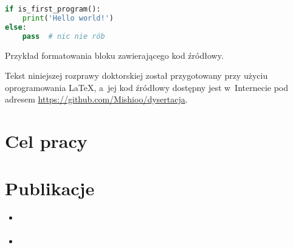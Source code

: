 \begin{listing}
\begin{lstlisting}[language=Python]
if is_first_program():
    print('Hello world!')
else:
    pass  # nic nie rób
\end{lstlisting}
\caption{Przykład formatowania bloku zawierającego kod źródłowy.}
\label{lst:example}
\end{listing}

Tekst niniejszej rozprawy doktorskiej został przygotowany przy użyciu oprogramowania \LaTeX,
  a~jej kod źródłowy dostępny jest w~Internecie pod adresem
  \url{https://github.com/Mishioo/dysertacja}.

\section{Cel pracy}\label{intro:goal}

\section{Publikacje}\label{intro:publications}
\begin{itemize}
  \item \cite{wieclaw21}
  \item \cite{stecko18}
\end{itemize}


